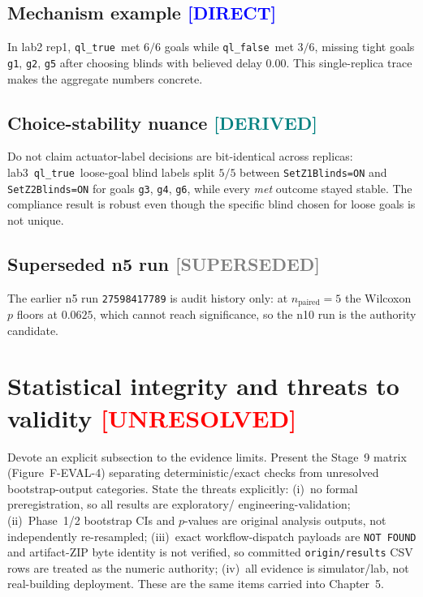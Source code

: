 \documentclass[12pt, a4paper, oneside]{memoir}
\newcommand{\evDirect}{\textcolor{blue}{[DIRECT]}}
\newcommand{\evDerived}{\textcolor{teal}{[DERIVED]}}
\newcommand{\evUnresolved}{\textcolor{red}{[UNRESOLVED]}}
\newcommand{\evSuperseded}{\textcolor{gray}{[SUPERSEDED]}}
\newcommand{\qlT}{\texttt{ql\_true}}
\newcommand{\qlF}{\texttt{ql\_false}}
\begin{document}
\subsection{Mechanism example \evDirect}

In lab2 rep1, \qlT\ met $6/6$ goals while \qlF\ met $3/6$, missing tight
goals \texttt{g1}, \texttt{g2}, \texttt{g5} after choosing blinds with
believed delay $0.00$.  This single-replica trace makes the aggregate numbers
concrete.

\subsection{Choice-stability nuance \evDerived}

Do not claim actuator-label decisions are bit-identical across replicas:
lab3~\qlT\ loose-goal blind labels split $5/5$ between
\texttt{SetZ1Blinds=ON} and \texttt{SetZ2Blinds=ON} for goals
\texttt{g3}, \texttt{g4}, \texttt{g6}, while every \emph{met} outcome stayed
stable.  The compliance result is robust even though the specific blind chosen
for loose goals is not unique.

\subsection{Superseded n5 run \evSuperseded}

The earlier n5 run \texttt{27598417789} is audit history only: at
$n_{\text{paired}} = 5$ the Wilcoxon $p$ floors at $0.0625$, which cannot
reach significance, so the n10 run is the authority candidate.

\section{Statistical integrity and threats to validity \evUnresolved}
\label{sec:eval-integrity}

Devote an explicit subsection to the evidence limits.  Present the Stage~9
matrix (Figure~F-EVAL-4) separating deterministic/exact checks from
unresolved bootstrap-output categories.  State the threats explicitly:
(i)~no formal preregistration, so all results are exploratory/%
engineering-validation;
(ii)~Phase~1/2 bootstrap CIs and $p$-values are original analysis outputs,
not independently re-resampled;
(iii)~exact workflow-dispatch payloads are \texttt{NOT FOUND} and
artifact-ZIP byte identity is not verified, so committed
\texttt{origin/results} CSV rows are treated as the numeric authority;
(iv)~all evidence is simulator/lab, not real-building deployment.
These are the same items carried into Chapter~5.
\end{document}

